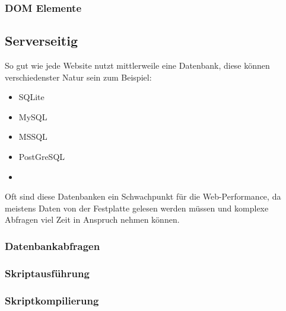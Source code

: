 \subsubsection{DOM Elemente}
\subsection{Serverseitig}
So gut wie jede Website nutzt mittlerweile eine Datenbank, diese können verschiedenster Natur sein zum Beispiel:
\begin{itemize}
\item SQLite
\item MySQL
\item MSSQL
\item PostGreSQL
\item 
\end{itemize}
Oft sind diese Datenbanken ein Schwachpunkt für die Web-Performance, da meistens Daten von der Festplatte gelesen werden müssen und komplexe Abfragen viel Zeit in Anspruch nehmen können.
\subsubsection{Datenbankabfragen}

\subsubsection{Skriptausführung}
\subsubsection{Skriptkompilierung}





%
%

